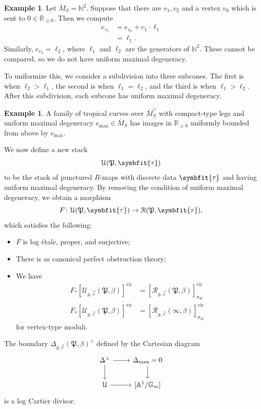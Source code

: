 \documentclass[10pt,oldfontcommands,oneside]{memoir}
\theoremstyle{definition}
\newtheorem{exm}[thm]{Example}
\theoremstyle{remark}
\theoremstyle{plain}
\theoremstyle{definition}
\theoremstyle{remark}
\newcommand{\A}{\mathbb{A}}
\newcommand{\G}{\mathbb{G}}
\newcommand{\N}{\mathbb{N}}
\newcommand{\R}{\mathbb{R}}
\newcommand{\mc}[1]{\mathcal{#1}}
\newcommand{\mf}[1]{\mathfrak{#1}}
\newcommand{\btau}{\symbfit{\tau}}
\newcommand{\mr}[1]{\mathrm{#1}}
\newcommand{\ol}[1]{\overline{#1}}
\newcommand{\1}{\mathbf{1}}
\newcommand{\2}{\mathbf{2}}
\newcommand{\3}{\mathbf{3}}
\newcommand{\vir}{\mr{vir}}
\begin{document}
\begin{exm}
    Let $\ol{M}_S = \N^2$. Suppose that there are $v_1, v_2$ and a vertex $v_0$ which is sent to $0 \in \R_{\geq 0}$. Then we compute
    \begin{align*}
        e_{v_1} &= e_{v_0} + c_1 \cdot \ell_1 \\
        &= \ell_1.
    \end{align*}
    Similarly, $e_{v_2} = \ell_2$, where $\ell_1$ and $\ell_2$ are the generators of $\N^2$. These cannot be compared, so we do not have uniform maximal degeneracy.

    To uniformize this, we consider a subdivision into three subcones. The first is when $\ell_2 > \ell_1$, the second is when $\ell_1 = \ell_2$, and the third is when $\ell_1 > \ell_2$. After this subdivision, each subcone has uniform maximal degeneracy.
\end{exm}

\begin{exm}
    A family of tropical curves over $\bar{M}_S^{\vee}$ with compact-type legs and uniform maximal degeneracy $e_{\max} \in \ol{M}_S$ has images in $\R_{\geq 0}$ uniformly bounded from above by $e_{\max}$.
\end{exm}

We now define a new stack
\[ \mc{U}(\mf{P}, \btau) \]
to be the stack of punctured $R$-maps with discrete data $\btau$ and having uniform maximal degeneracy. By removing the condition of uniform maximal degeneracy, we obtain a morphism
\[ F \colon \mc{U}(\mf{P}, \btau) \to \mc{R}(\mf{P}, \btau), \]
which satisfies the following:
\begin{itemize}
    \item $F$ is log \'etale, proper, and surjective;
    \item There is as canonical perfect obstruction theory;
    \item We have
        \begin{align*}
            F_* [ \mc{U}_{g, \vec{c}}(\mf{P}, \beta) ]^{\vir} &= [\mc{R}_{g,\vec{c}}(\mf{P}, \beta) ]^{\vir}_{\sigma_W} \\
            F_* [ \mc{U}_{g, \vec{c}}(\mf{P}, \beta) ]^{\vir} &= [\mc{R}_{g,\vec{c}}(\infty, \beta) ]^{\vir}_{\sigma_W}
        \end{align*}
        for vertex-type moduli.
\end{itemize}

The boundary $\Delta_{g, \vec{c}}(\mf{P}, \beta)^{\curlywedge}$ defined by the Cartesian diagram
\begin{equation*}
\begin{tikzcd}
    \Delta^{\curlywedge} \ar{r} \ar{d} & \Delta_{\max} = 0 \ar{d} \\
    \mc{U} \ar{r} & { [\A^1/\G_m] }
\end{tikzcd}
\end{equation*}
is a log Cartier divisor.
\end{document}
